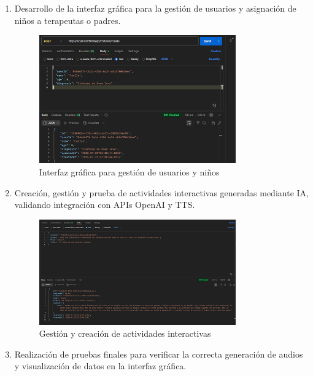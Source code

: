 \begin{enumerate}
\item Desarrollo de la interfaz gráfica para la gestión de usuarios y asignación de niños a terapeutas o padres.

\vspace{0.5cm}
\begin{figure}[H]
    \centering
    \includegraphics[width=0.8\textwidth]{imagenes/interfaz_gestion_usuarios.png}
    \caption{Interfaz gráfica para gestión de usuarios y niños}
    \label{fig:interfaz_gestion_usuarios}
\end{figure}
\vspace{0.5cm}

\item Creación, gestión y prueba de actividades interactivas generadas mediante IA, validando integración con APIs OpenAI y TTS.

\vspace{0.5cm}
\begin{figure}[H]
    \centering
    \includegraphics[width=0.8\textwidth]{imagenes/gestion_actividades.png}
    \caption{Gestión y creación de actividades interactivas}
    \label{fig:gestion_actividades}
\end{figure}
\vspace{0.5cm}

\item Realización de pruebas finales para verificar la correcta generación de audios y visualización de datos en la interfaz gráfica.


\end{enumerate}
